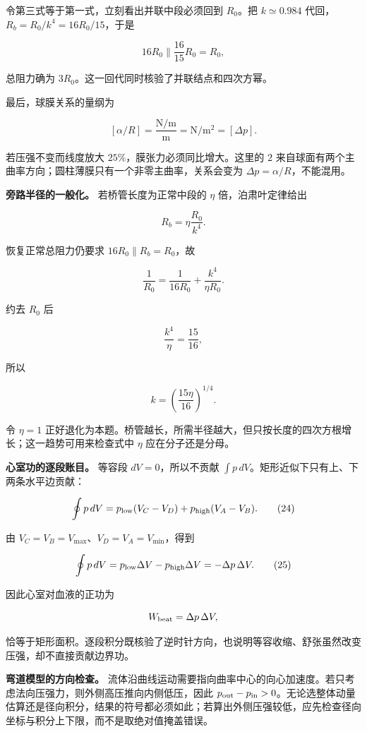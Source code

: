 \documentclass[12pt,a4paper,UTF8]{ctexart}
\begin{document}
令第三式等于第一式，立刻看出并联中段必须回到 \(R_0\)。把
\(k\simeq0.984\) 代回，\(R_b=R_0/k^4=16R_0/15\)，于是

\[
16R_0\parallel\frac{16}{15}R_0=R_0,
\]

总阻力确为 \(3R_0\)。这一回代同时核验了并联结点和四次方幂。

最后，球膜关系的量纲为

\[
[\alpha/R]=\frac{\mathrm{N/m}}{\mathrm m}=\mathrm{N/m^2}=[\Delta p].
\]

若压强不变而线度放大 \(25\%\)，膜张力必须同比增大。这里的 \(2\)
来自球面有两个主曲率方向；圆柱薄膜只有一个非零主曲率，关系会变为
\(\Delta p=\alpha/R\)，不能混用。

\textbf{旁路半径的一般化。} 若桥管长度为正常中段的 \(\eta\)
倍，泊肃叶定律给出

\[
R_b=\eta\frac{R_0}{k^4}. \tag{22}
\]

恢复正常总阻力仍要求 \(16R_0\parallel R_b=R_0\)，故

\[
\frac1{R_0}=\frac1{16R_0}+\frac{k^4}{\eta R_0}.
\]

约去 \(R_0\) 后

\[
\frac{k^4}{\eta}=\frac{15}{16},
\]

所以

\[
\boxed{k=\left(\frac{15\eta}{16}\right)^{1/4}}. \tag{23}
\]

令 \(\eta=1\)
正好退化为本题。桥管越长，所需半径越大，但只按长度的四次方根增长；这一趋势可用来检查式中
\(\eta\) 应在分子还是分母。

\textbf{心室功的逐段账目。} 等容段 \(dV=0\)，所以不贡献
\(\int p\,dV\)。矩形近似下只有上、下两条水平边贡献：

\[
\oint p\,dV
=p_{\rm low}(V_C-V_D)
+p_{\rm high}(V_A-V_B). \tag{24}
\]

由 \(V_C=V_B=V_{\max}\)、\(V_D=V_A=V_{\min}\)，得到

\[
\oint p\,dV
=p_{\rm low}\Delta V-p_{\rm high}\Delta V
=-\Delta p\,\Delta V. \tag{25}
\]

因此心室对血液的正功为

\[
W_{\rm beat}=\Delta p\,\Delta V,
\]

恰等于矩形面积。逐段积分既核验了逆时针方向，也说明等容收缩、舒张虽然改变压强，却不直接贡献边界功。

\textbf{弯道模型的方向检查。}
流体沿曲线运动需要指向曲率中心的向心加速度。若只考虑法向压强力，则外侧高压推向内侧低压，因此
\(p_{\rm out}-p_{\rm in}>0\)。无论选整体动量估算还是径向积分，结果的符号都必须如此；若算出外侧压强较低，应先检查径向坐标与积分上下限，而不是取绝对值掩盖错误。
\end{document}
